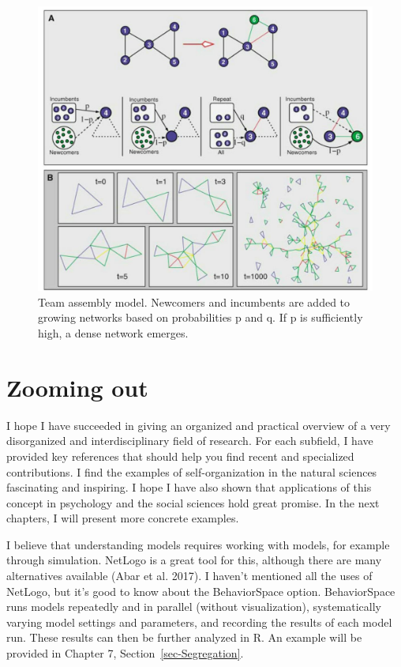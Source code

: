 \documentclass[
  a4paper,
  DIV=11,
  numbers=noendperiod]{scrreprt}
\begin{document}
\begin{figure}

{\centering \includegraphics{media/ch5n/image10.jpg}

}

\caption{\label{fig-ch5n-img10-old-48}Team assembly model. Newcomers and
incumbents are added to growing networks based on probabilities p and q.
If p is sufficiently high, a dense network emerges.}

\end{figure}

\hypertarget{sec-Zooming-out}{%
\section{Zooming out}\label{sec-Zooming-out}}

I hope I have succeeded in giving an organized and practical overview of
a very disorganized and interdisciplinary field of research. For each
subfield, I have provided key references that should help you find
recent and specialized contributions. I find the examples of
self-organization in the natural sciences fascinating and inspiring. I
hope I have also shown that applications of this concept in psychology
and the social sciences hold great promise. In the next chapters, I will
present more concrete examples.

I believe that understanding models requires working with models, for
example through simulation. NetLogo is a great tool for this, although
there are many alternatives available (Abar et al. 2017). I haven't
mentioned all the uses of NetLogo, but it's good to know about the
BehaviorSpace option. BehaviorSpace runs models repeatedly and in
parallel (without visualization), systematically varying model settings
and parameters, and recording the results of each model run. These
results can then be further analyzed in R. An example will be provided
in Chapter 7, Section~\ref{sec-Segregation}.
\end{document}
